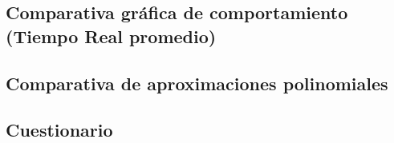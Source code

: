 \documentclass[12pt]{article}
\begin{document}
			\subsection{Comparativa gráfica de comportamiento (Tiempo Real promedio)}
			
			\subsection{Comparativa de aproximaciones polinomiales}


		\subsection{Cuestionario}
\end{document}
